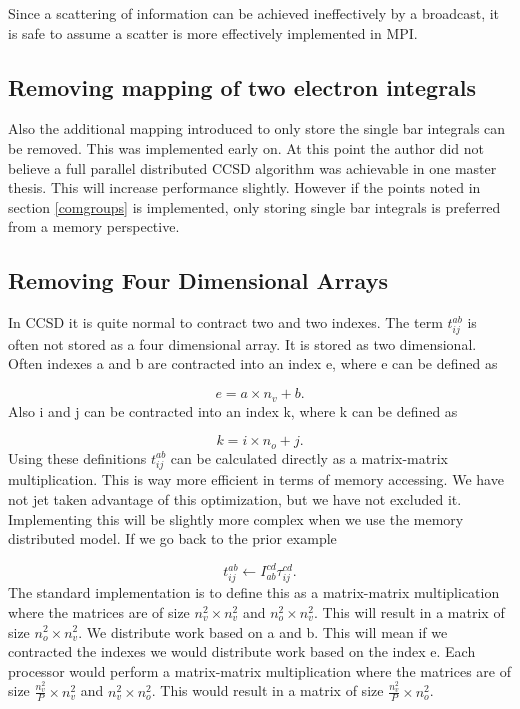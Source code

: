 \documentclass[a4paper,norsk,11pt,twoside]{report}
\begin{document}
Since a scattering of information can be achieved ineffectively by a broadcast, it is safe to assume a scatter is more effectively implemented in MPI.

\subsection{Removing mapping of two electron integrals}
Also the additional mapping introduced to only store the single bar integrals can be removed. This was implemented early on. At this point the author did not believe a full parallel distributed CCSD algorithm was achievable in one master thesis. This will increase performance slightly. However if the points noted in section \ref{comgroups} is implemented, only storing single bar integrals is preferred from a memory perspective. 

\subsection{Removing Four Dimensional Arrays}
In CCSD it is quite normal to contract two and two indexes. The term $t_{ij}^{ab}$ is often not stored as a four dimensional array. It is stored as two dimensional. Often indexes a and b are contracted into an index e, where e can be defined as

\begin{equation}
e = a \times n_v + b .
\end{equation}
Also i and j can be contracted into an index k, where k can be defined as

\begin{equation}
k = i \times n_o + j .
\end{equation}
Using these definitions $t_{ij}^{ab}$ can be calculated directly as a matrix-matrix multiplication. This is way more efficient in terms of memory accessing. We have not jet taken advantage of this optimization, but we have not excluded it. \\

Implementing this will be slightly more complex when we use the memory distributed model. If we go back to the prior example

\begin{equation}
t_{ij}^{ab} \leftarrow I_{ab}^{cd} \tau_{ij}^{cd} .
\end{equation}
The standard implementation is to define this as a matrix-matrix multiplication where the matrices are of size $n_v^2 \times n_v^2$ and $n_o^2 \times n_v^2$. This will result in a matrix of size $n_o^2 \times n_v^2$. We distribute work based on a and b. This will mean if we contracted the indexes we would distribute work based on the index e. Each processor would perform a matrix-matrix multiplication where the matrices are of size $\frac{n_v^2}{P} \times n_v^2$ and $n_v^2 \times n_o^2$. This would result in a matrix of size $\frac{n_v^2}{P} \times n_o^2$. \\
\end{document}
